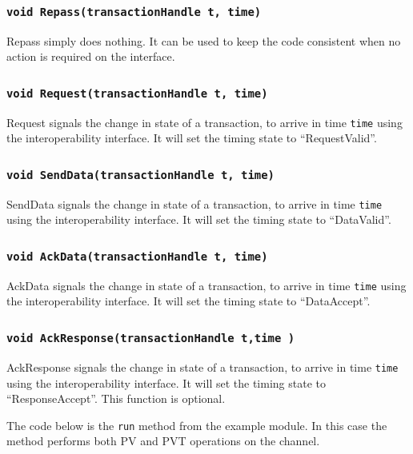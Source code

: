 \documentclass[12pt,oneside]{gsbook}
\begin{document}
\subsubsection    {\tt void Repass(transactionHandle t, time)}
Repass simply does nothing. It can be used to keep the code consistent
when no action is required on the interface.

\subsubsection    {\tt void Request(transactionHandle t, time)}
Request signals the change in state of a transaction, to arrive in time {\tt time} using the
interoperability interface. It will set the timing state to
``RequestValid''.

\subsubsection    {\tt void SendData(transactionHandle t, time)}
SendData  signals the change in state of a transaction, to arrive in time {\tt time} using the
interoperability interface. It will set the timing state to
``DataValid''.

\subsubsection    {\tt void AckData(transactionHandle t, time)}
AckData signals the change in state of a transaction, to arrive in time {\tt time} using the
interoperability interface. It will set the timing state to
``DataAccept''.

\subsubsection    {\tt void AckResponse(transactionHandle t,time )}
AckResponse signals the change in state of a transaction, to arrive in time {\tt time} using the
interoperability interface. It will set the timing state to
``ResponseAccept''. This function is optional.


The code below is the {\tt run} method from the example module. In
this case the method performs both PV and PVT operations on the
channel.
\end{document}
